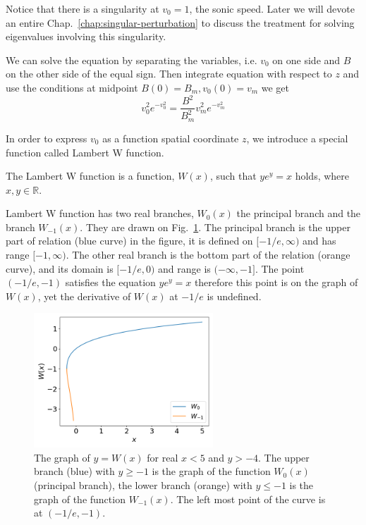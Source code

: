 Notice that there is a singularity at $v_0=1$, the sonic speed. Later we will devote an entire Chap.~\ref{chap:singular-perturbation} to discuss the treatment for solving eigenvalues involving this singularity.

We can solve the equation by separating the variables, i.e. $v_0$ on one side and $B$ on the other side of the equal sign. Then integrate equation with respect to $z$ and use the conditions at midpoint $B(0)=B_m, v_0(0)=v_m$ we get
\begin{equation}
	v_0^2e^{-v_0^2} = \frac{B^2}{B_m^2}v_m^2e^{-v_m^2}
\end{equation}

In order to express $v_0$ as a function spatial coordinate $z$, we introduce a special function called Lambert W function.

\begin{definition}
	The Lambert W function is a function, $W(x)$, such that $ye^y = x$ holds, where $x,y\in\mathbb{R}$.
\end{definition}
Lambert W function has two real branches, $W_0(x)$ the principal branch and the branch $W_{-1}(x)$. They are drawn on Fig.~\ref{fig:lambert-w}. The principal branch is the upper part of relation (blue curve) in the figure, it is defined on $[-1/e, \infty)$ and has range $[-1, \infty)$. The other real branch is the bottom part of the relation (orange curve), and its domain is $[-1/e, 0)$ and range is $(-\infty, -1]$. The point $(-1/e,-1)$ satisfies the equation $ye^y=x$ therefore this point is on the graph of $W(x)$, yet the derivative of $W(x)$ at $-1/e$ is undefined.

\begin{figure}[htbp]
	\centering
	\includegraphics[width=0.6\textwidth]{figures/lambert-w.png}
	\caption{The graph of $y=W(x)$ for real $x<5$ and $y>-4$. The upper branch (blue) with $y\geq-1$ is the graph of the function $W_0(x)$ (principal branch), the lower branch (orange) with $y\leq -1$ is the graph of the function $W_{-1}(x)$. The left most point of the curve is at $(-1/e,-1)$.}
	\label{fig:lambert-w}
\end{figure}

